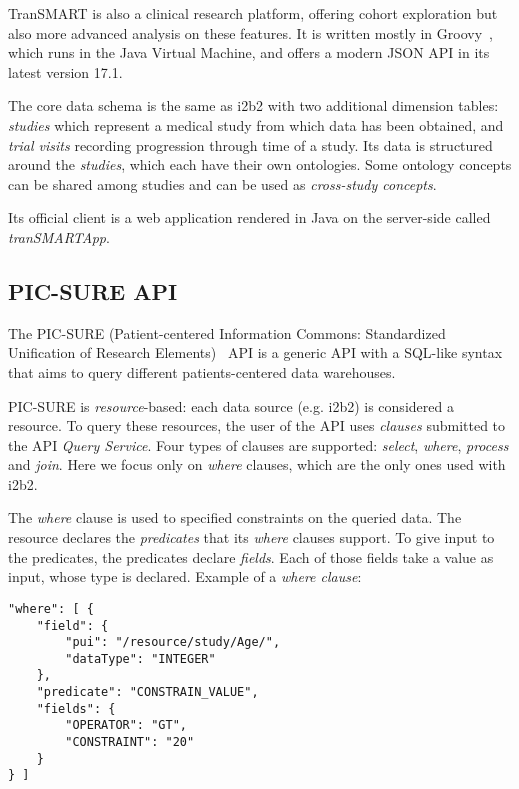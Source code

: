 TranSMART is also a clinical research platform, offering cohort exploration but also more advanced analysis on these features.
It is written mostly in Groovy~\cite{todo}, which runs in the Java Virtual Machine, and offers a modern JSON API in its latest version 17.1.

The core data schema is the same as i2b2 with two additional dimension tables: \emph{studies} which represent a medical study from which data has been obtained, and \emph{trial visits} recording progression through time of a study.
Its data is structured around the \emph{studies}, which each have their own ontologies.
Some ontology concepts can be shared among studies and can be used as \emph{cross-study concepts}.

Its official client is a web application rendered in Java on the server-side called \emph{tranSMARTApp}.


\subsection{PIC-SURE API}
\label{sec:bg-picsure}

The PIC-SURE (Patient-centered Information Commons: Standardized Unification of Research Elements)~\cite{PIC-SURE} API is a generic API with a SQL-like syntax that aims to query different patients-centered data warehouses.

PIC-SURE is \emph{resource}-based: each data source (e.g. i2b2) is considered a resource.
To query these resources, the user of the API uses \emph{clauses} submitted to the API \emph{Query Service}.
Four types of clauses are supported: \emph{select}, \emph{where}, \emph{process} and \emph{join}.
Here we focus only on \emph{where} clauses, which are the only ones used with i2b2.

The \emph{where} clause is used to specified constraints on the queried data.
The resource declares the \emph{predicates} that its \emph{where} clauses support.
To give input to the predicates, the predicates declare \emph{fields}.
Each of those fields take a value as input, whose type is declared.
Example of a \emph{where clause}:
\begin{verbatim}
"where": [ {
    "field": {
        "pui": "/resource/study/Age/",
        "dataType": "INTEGER"
    },
    "predicate": "CONSTRAIN_VALUE",
    "fields": {
        "OPERATOR": "GT",
        "CONSTRAINT": "20"
    }
} ]
\end{verbatim}

